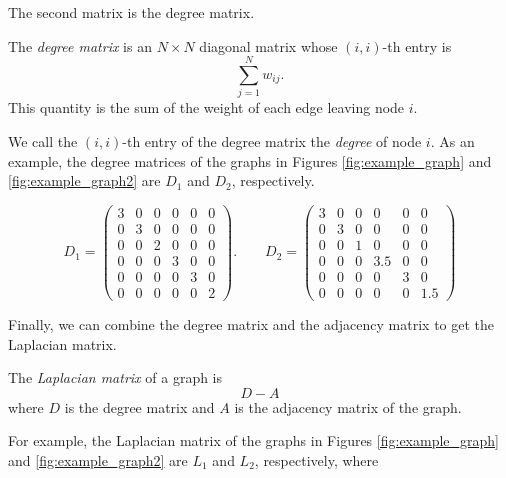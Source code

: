 The second matrix is the degree matrix.
\begin{definition} The \emph{degree matrix} is an $N \times N$ diagonal matrix whose $(i,i)$-th entry is
\[
\sum_{j=1}^N w_{ij}.
\]
This quantity is the sum of the weight of each edge leaving node $i$.
\end{definition}
We call the $(i, i)$-th entry of the degree matrix the \emph{degree} of node $i$. As an example, the degree matrices of the graphs in Figures \ref{fig:example_graph} and \ref{fig:example_graph2} are $D_1$ and $D_2$, respectively.

\[
D_1 = \begin{pmatrix}
3 & 0 & 0 & 0 & 0 & 0\\
0 & 3 & 0 & 0 & 0 & 0\\
0 & 0 & 2 & 0 & 0 & 0\\
0 & 0 & 0 & 3 & 0 & 0\\
0 & 0 & 0 & 0 & 3 & 0\\
0 & 0 & 0 & 0 & 0 & 2
\end{pmatrix}. \qquad D_2 =
 \begin{pmatrix}
3 & 0 & 0 & 0 & 0 & 0\\
0 & 3 & 0 & 0 & 0 & 0\\
0 & 0 & 1 & 0 & 0 & 0\\
0 & 0 & 0 & 3.5 & 0 & 0\\
0 & 0 & 0 & 0 & 3 & 0\\
0 & 0 & 0 & 0 & 0 & 1.5
\end{pmatrix}
\]

Finally, we can combine the degree matrix and the adjacency matrix to get the Laplacian matrix.
\begin{definition}
The \emph{Laplacian matrix} of a graph is
\[D - A \]
where $D$ is the degree matrix and $A$ is the adjacency matrix of the graph.
\end{definition}

For example, the Laplacian matrix of the graphs in Figures \ref{fig:example_graph} and \ref{fig:example_graph2} are $L_1$ and $L_2$, respectively, where

